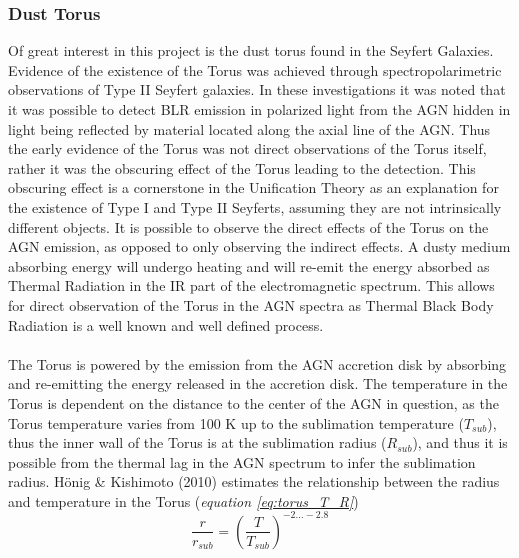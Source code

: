 \documentclass[11pt]{article}
\begin{document}
\subsubsection{Dust Torus}
Of great interest in this project is the dust torus found in the Seyfert Galaxies. Evidence of the existence of the Torus was achieved through spectropolarimetric observations of Type II Seyfert galaxies. In these investigations it was noted that it was possible to detect BLR emission in polarized light from the AGN hidden in light being reflected by material located along the axial line of the AGN. Thus the early evidence of the Torus was not direct observations of the Torus itself, rather it was the obscuring effect of the Torus leading to the detection. This obscuring effect is a cornerstone in the Unification Theory as an explanation for the existence of Type I and Type II Seyferts, assuming they are not intrinsically different objects. It is possible to observe the direct effects of the Torus on the AGN emission, as opposed to only observing the indirect effects. A dusty medium absorbing energy will undergo heating and will re-emit the energy absorbed as Thermal Radiation in the IR part of the electromagnetic spectrum. This allows for direct observation of the Torus in the AGN spectra as Thermal Black Body Radiation is a well known and well defined process. \\
\\
The Torus is powered by the emission from the AGN accretion disk by absorbing and re-emitting the energy released in the accretion disk. The temperature in the Torus is dependent on the distance to the center of the AGN in question, as the Torus temperature varies from 100 K up to the sublimation temperature ($T_{sub}$), thus the inner wall of the Torus is at the sublimation radius ($R_{sub}$), and thus it is possible from the thermal lag in the AGN spectrum to infer the sublimation radius. Hönig \& Kishimoto (2010) estimates the relationship between the radius and temperature in the Torus (\emph{equation \ref{eq:torus_T_R}}) 
\begin{equation}
\frac{r}{r_{sub}} = (\frac{T}{T_{sub}})^{-2...-2.8}
\label{eq:torus_T_R}
\end{equation}\\
\\
\end{document}
